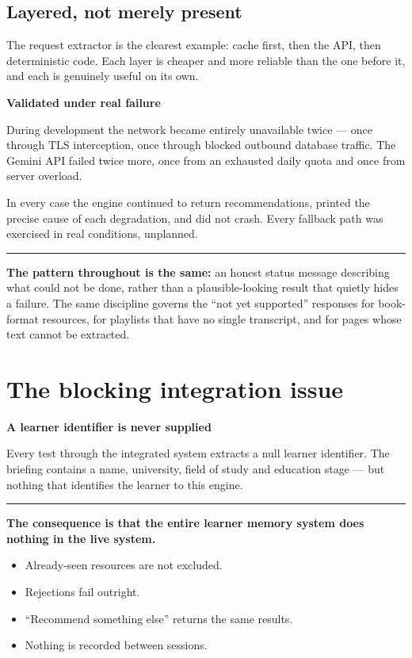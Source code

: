 \documentclass[11pt,a4paper]{article}
\newenvironment{callout}[1]
  {\par\vspace{8pt}\noindent
   \begin{lrbox}{\calloutbox}
   \begin{minipage}{\dimexpr\textwidth-2\fboxsep-8pt\relax}
   \vspace{4pt}
   {\bfseries\color{navy}#1}\par\vspace{4pt}}
  {\vspace{4pt}\end{minipage}%
   \end{lrbox}%
   \noindent\textcolor{navy}{\rule[-\dp\calloutbox]{3pt}{\dimexpr\ht\calloutbox+\dp\calloutbox\relax}}%
   \colorbox{headshade}{\usebox{\calloutbox}}%
   \par\vspace{10pt}}
\begin{document}
\subsection{Layered, not merely present}

The request extractor is the clearest example: cache first, then the API, then
deterministic code. Each layer is cheaper and more reliable than the one
before it, and each is genuinely useful on its own.

\begin{callout}{Validated under real failure}
During development the network became entirely unavailable twice --- once
through TLS interception, once through blocked outbound database traffic. The
Gemini API failed twice more, once from an exhausted daily quota and once from
server overload.
\par\vspace{4pt}
In every case the engine continued to return recommendations, printed the
precise cause of each degradation, and did not crash. Every fallback path was
exercised in real conditions, unplanned.
\end{callout}

\textbf{The pattern throughout is the same:} an honest status message
describing what could not be done, rather than a plausible-looking result that
quietly hides a failure. The same discipline governs the ``not yet supported''
responses for book-format resources, for playlists that have no single
transcript, and for pages whose text cannot be extracted.

\newpage
\section{The blocking integration issue}

\begin{callout}{A learner identifier is never supplied}
Every test through the integrated system extracts a null learner identifier.
The briefing contains a name, university, field of study and education stage
--- but nothing that identifies the learner to this engine.
\end{callout}

\textbf{The consequence is that the entire learner memory system does nothing
in the live system.}

\begin{itemize}
\item Already-seen resources are not excluded.
\item Rejections fail outright.
\item ``Recommend something else'' returns the same results.
\item Nothing is recorded between sessions.
\end{itemize}
\end{document}
